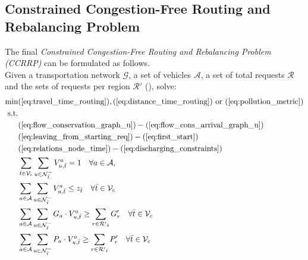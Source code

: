 \subsection{Constrained Congestion-Free Routing and Rebalancing Problem}
The final \textit{Constrained Congestion-Free Routing and Rebalancing Problem (CCRRP)} can be formulated as follows. \\
Given a transportation network $\mathcal{G}$, a set of vehicles $\mathcal{A}$, a set of total requests $\mathcal{R}$ and the sets of requests per region $\mathcal{R}'$ (), solve: \\

\begin{align}
	\text{min}&  
		(\ref{eq:travel_time_routing}), (\ref{eq:distance_time_routing}) \text{ or } (\ref{eq:pollution_metric})
	\nonumber\\
	\text{s.t.} &\nonumber\\
	&(\ref{eq:flow_conservation_graph_u})-(\ref{eq:flow_cons_arrival_graph_u})\nonumber\\
	&(\ref{eq:leaving_from_starting_req})-(\ref{eq:first_start})	\nonumber\\
	&(\ref{eq:relations_node_time})-(\ref{eq:discharging_constraints})\nonumber\\
	&\sum_{\bar{t} \in \mathcal{V}_c}\sum_{ u \in \mathcal{N}^-_{\bar{t}} }V^a_{u, \bar{t}} = 1 \quad \forall a \in \mathcal{A},  \label{eq:each_vehicle_end2}\\
	&\sum_{a \in \mathcal{A}}\sum_{u \in \mathcal{N}^-_{\bar{t}} } V^a_{u, \bar{t}} \leq z_{\bar{t}} \quad \forall \bar{t} \in \mathcal{V}_c \label{eq:capacity_depot_respected2}\\
	&\sum_{a \in \mathcal{A}}\sum_{u \in \mathcal{N}^-_{\bar{t}} } G_a \cdot V^a_{u, \bar{t}} \ge \sum_{r \in \mathcal{R'}_{\bar{t}}} G'_r \quad \forall \bar{t} \in \mathcal{V}_c \label{eq:goods_cap2}\\
	&\sum_{a \in \mathcal{A}}\sum_{u \in \mathcal{N}^-_{\bar{t}} } P_a \cdot V^a_{u, \bar{t}} \ge \sum_{r \in \mathcal{R'}_{\bar{t}}} P'_r \quad \forall \bar{t} \in \mathcal{V}_c \label{eq:people_cap2}\\
\end{align}

